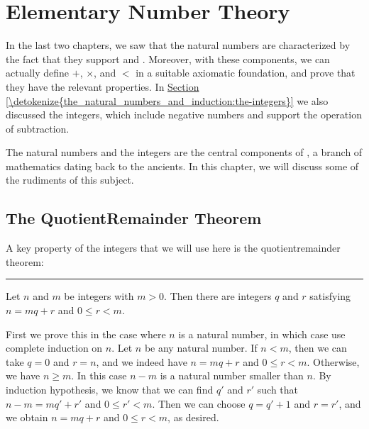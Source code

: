 \documentclass[letterpaper,10pt,english]{sphinxmanual}
\begin{document}
\chapter{Elementary Number Theory}
\label{\detokenize{elementary_number_theory:elementary-number-theory}}\label{\detokenize{elementary_number_theory:id1}}\label{\detokenize{elementary_number_theory::doc}}
\sphinxAtStartPar
In the last two chapters, we saw that the natural numbers are characterized by the fact that they support  and . Moreover, with these components, we can actually define \(+\), \(\times\), and \(<\) in a suitable axiomatic foundation, and prove that they have the relevant properties. In \hyperref[\detokenize{the_natural_numbers_and_induction:the-integers}]{Section \ref{\detokenize{the_natural_numbers_and_induction:the-integers}}} we also discussed the integers, which include negative numbers and support the operation of subtraction.

\sphinxAtStartPar
The natural numbers and the integers are the central components of , a branch of mathematics dating back to the ancients. In this chapter, we will discuss some of the rudiments of this subject.


\section{The Quotient\sphinxhyphen{}Remainder Theorem}
\label{\detokenize{elementary_number_theory:the-quotient-remainder-theorem}}
\sphinxAtStartPar
A key property of the integers that we will use here is the quotient\sphinxhyphen{}remainder theorem:


\bigskip\hrule\bigskip


\sphinxAtStartPar
{} Let \(n\) and \(m\) be integers with \(m > 0\). Then there are integers \(q\) and \(r\) satisfying \(n = m q + r\) and \(0 \le r < m\).

\sphinxAtStartPar
{} First we prove this in the case where \(n\) is a natural number, in which case use complete induction on \(n\). Let \(n\) be any natural number. If \(n < m\), then we can take \(q = 0\) and \(r = n\), and we indeed have \(n = m q + r\) and \(0 \le r < m\). Otherwise, we have \(n \geq m\). In this case \(n - m\) is a natural number smaller than \(n\). By induction hypothesis, we know that we can find \(q'\) and \(r'\) such that \(n - m = m q' + r'\) and \(0 \le r' < m\). Then we can choose \(q = q' + 1\) and \(r = r'\), and we obtain \(n = m q + r\) and \(0 \le r < m\), as desired.
\end{document}
